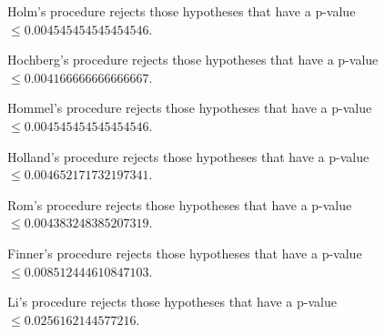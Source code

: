 \documentclass[a4paper,10pt]{article}
\begin{document}
\begin{landscape}
Holm's procedure rejects those hypotheses that have a p-value $\le0.004545454545454546$.


Hochberg's procedure rejects those hypotheses that have a p-value $\le0.004166666666666667$.


Hommel's procedure rejects those hypotheses that have a p-value $\le0.004545454545454546$.


Holland's procedure rejects those hypotheses that have a p-value $\le0.004652171732197341$.


Rom's procedure rejects those hypotheses that have a p-value $\le0.004383248385207319$.


Finner's procedure rejects those hypotheses that have a p-value $\le0.008512444610847103$.


Li's procedure rejects those hypotheses that have a p-value $\le0.0256162144577216$.



\newpage


\end{landscape}
\end{document}
